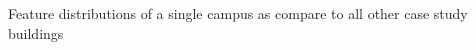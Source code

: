 Feature distributions of a single campus as compare to all other case study buildings
\label{fig:campusperformance}